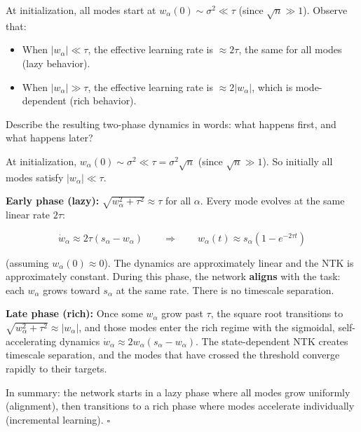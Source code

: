 \documentclass[11pt]{article}
\providecommand{\tightlist}{%
  \setlength{\itemsep}{0pt}\setlength{\parskip}{0pt}}
\begin{document}
\begin{exercise}
\label{ex:td-5b}
At initialization, all modes
start at \(w_\alpha(0) \sim \sigma^2 \ll \tau\) (since
\(\sqrt{n} \gg 1\)). Observe that:

\begin{itemize}
\tightlist
\item
  When \(|w_\alpha| \ll \tau\), the effective learning rate is
  \(\approx 2\tau\), the same for all modes (lazy behavior).
\item
  When \(|w_\alpha| \gg \tau\), the effective learning rate is
  \(\approx 2|w_\alpha|\), which is mode-dependent (rich behavior).
\end{itemize}

Describe the resulting two-phase dynamics in words: what happens first,
and what happens later?
\end{exercise}

\begin{solution}[ex:td-5b]
At initialization,
\(w_\alpha(0) \sim \sigma^2 \ll \tau = \sigma^2\sqrt{n}\) (since
\(\sqrt{n} \gg 1\)). So initially all modes satisfy
\(|w_\alpha| \ll \tau\).

\textbf{Early phase (lazy):} \(\sqrt{w_\alpha^2 + \tau^2} \approx \tau\)
for all \(\alpha\). Every mode evolves at the same linear rate
\(2\tau\):

\[\dot{w}_\alpha \approx 2\tau(s_\alpha - w_\alpha) \qquad \Longrightarrow \qquad w_\alpha(t) \approx s_\alpha(1 - e^{-2\tau t})\]

(assuming \(w_\alpha(0) \approx 0\)). The dynamics are approximately
linear and the NTK is approximately constant. During this phase, the
network \textbf{aligns} with the task: each \(w_\alpha\) grows toward
\(s_\alpha\) at the same rate. There is no timescale separation.

\textbf{Late phase (rich):} Once some \(w_\alpha\) grow past \(\tau\),
the square root transitions to
\(\sqrt{w_\alpha^2 + \tau^2} \approx |w_\alpha|\), and those modes enter
the rich regime with the sigmoidal, self-accelerating dynamics
\(\dot{w}_\alpha \approx 2w_\alpha(s_\alpha - w_\alpha)\). The
state-dependent NTK creates timescale separation, and the modes that
have crossed the threshold converge rapidly to their targets.

In summary: the network starts in a lazy phase where all modes grow
uniformly (alignment), then transitions to a rich phase where modes
accelerate individually (incremental learning). \(\square\)
\end{solution}
\end{document}
